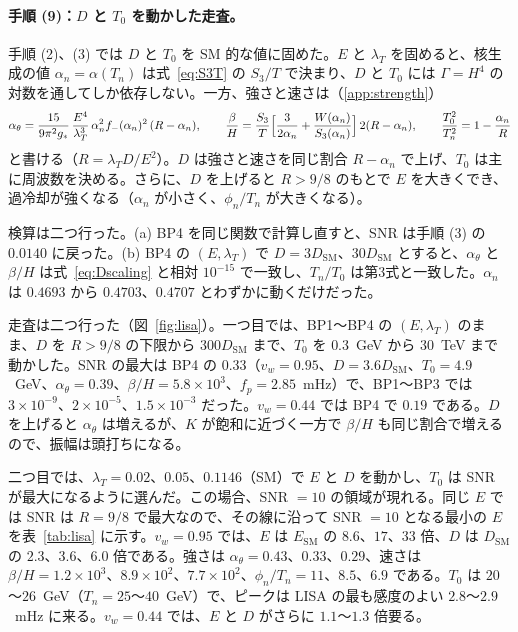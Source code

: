 \documentclass[a4paper,10pt]{ltjsarticle}
\begin{document}
\paragraph{手順 (9)：$D$ と $T_0$ を動かした走査。}手順 (2)、(3) では $D$ と $T_0$ を SM 的な値に固めた。$E$ と $\lambda_T$ を固めると、核生成の値 $\alpha_n=\alpha(T_n)$ は式~\eqref{eq:S3T} の $S_3/T$ で決まり、$D$ と $T_0$ には $\Gamma=H^4$ の対数を通してしか依存しない。一方、強さと速さは（\ref{app:strength}）
\begin{equation}
\alpha_\theta=\frac{15}{9\pi^2g_*}\,\frac{E^4}{\lambda_T^3}\,\alpha_n^2f_-(\alpha_n)^2\,(R-\alpha_n),\qquad
\frac\beta H=\frac{S_3}{T}\Bigl[\frac{3}{2\alpha_n}+\frac{W(\alpha_n)}{S_3(\alpha_n)}\Bigr]\,2(R-\alpha_n),\qquad
\frac{T_0^2}{T_n^2}=1-\frac{\alpha_n}{R}
\label{eq:Dscaling}
\end{equation}
と書ける（$R=\lambda_TD/E^2$）。$D$ は強さと速さを同じ割合 $R-\alpha_n$ で上げ、$T_0$ は主に周波数を決める。さらに、$D$ を上げると $R>9/8$ のもとで $E$ を大きくでき、過冷却が強くなる（$\alpha_n$ が小さく、$\phi_n/T_n$ が大きくなる）。

検算は二つ行った。(a) BP4 を同じ関数で計算し直すと、SNR は手順 (3) の $0.0140$ に戻った。(b) BP4 の $(E,\lambda_T)$ で $D=3D_{\mathrm{SM}}$、$30D_{\mathrm{SM}}$ とすると、$\alpha_\theta$ と $\beta/H$ は式~\eqref{eq:Dscaling} と相対 $10^{-15}$ で一致し、$T_n/T_0$ は第3式と一致した。$\alpha_n$ は $0.4693$ から $0.4703$、$0.4707$ とわずかに動くだけだった。

走査は二つ行った（図~\ref{fig:lisa}）。一つ目では、BP1〜BP4 の $(E,\lambda_T)$ のまま、$D$ を $R>9/8$ の下限から $300D_{\mathrm{SM}}$ まで、$T_0$ を $0.3$~GeV から $30$~TeV まで動かした。SNR の最大は BP4 の $0.33$（$v_w=0.95$、$D=3.6D_{\mathrm{SM}}$、$T_0=4.9$~GeV、$\alpha_\theta=0.39$、$\beta/H=5.8\times10^3$、$f_p=2.85$~mHz）で、BP1〜BP3 では $3\times10^{-9}$、$2\times10^{-5}$、$1.5\times10^{-3}$ だった。$v_w=0.44$ では BP4 で $0.19$ である。$D$ を上げると $\alpha_\theta$ は増えるが、$K$ が飽和に近づく一方で $\beta/H$ も同じ割合で増えるので、振幅は頭打ちになる。

二つ目では、$\lambda_T=0.02$、$0.05$、$0.1146$（SM）で $E$ と $D$ を動かし、$T_0$ は SNR が最大になるように選んだ。この場合、SNR $=10$ の領域が現れる。同じ $E$ では SNR は $R=9/8$ で最大なので、その線に沿って SNR $=10$ となる最小の $E$ を表~\ref{tab:lisa} に示す。$v_w=0.95$ では、$E$ は $E_{\mathrm{SM}}$ の $8.6$、$17$、$33$ 倍、$D$ は $D_{\mathrm{SM}}$ の $2.3$、$3.6$、$6.0$ 倍である。強さは $\alpha_\theta=0.43$、$0.33$、$0.29$、速さは $\beta/H=1.2\times10^3$、$8.9\times10^2$、$7.7\times10^2$、$\phi_n/T_n=11$、$8.5$、$6.9$ である。$T_0$ は $20$〜$26$~GeV（$T_n=25$〜$40$~GeV）で、ピークは LISA の最も感度のよい $2.8$〜$2.9$~mHz に来る。$v_w=0.44$ では、$E$ と $D$ がさらに $1.1$〜$1.3$ 倍要る。
\end{document}
